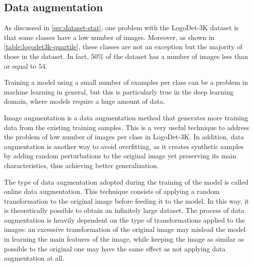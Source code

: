 \subsection{Data augmentation}
\label{sec:methods-augment}
As discussed in \autoref{sec:dataset-stat}, one problem with the LogoDet-3K dataset is that some classes have a low number of images. Moreover, as shown in \autoref{table:logodet3k-quartile}, these classes are not an exception but the majority of those in the dataset. In fact, 50\% of the dataset has a number of images less than or equal to 54.

Training a model using a small number of examples per class can be a problem in machine learning in general, but this is particularly true in the deep learning domain, where models require a huge amount of data.

Image augmentation is a data augmentation method that generates more training data from the existing training samples.
This is a very useful technique to address the problem of low number of images per class in LogoDet-3K.
In addition, data augmentation is another way to avoid overfitting, as it creates synthetic samples by adding random perturbations to the original image yet preserving its main characteristics, thus achieving better generalization.

The type of data augmentation adopted during the training of the model is called online data augmentation.
This technique consists of applying a random transformation to the original image before feeding it to the model.
In this way, it is theoretically possible to obtain an infinitely large dataset. The process of data augmentation is heavily dependent on the type of transformations applied to the images: an excessive transformation of the original image may mislead the model in learning the main features of the image, while keeping the image as similar as possible to the original one may have the same effect as not applying data augmentation at all.

